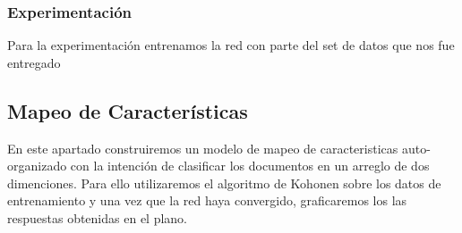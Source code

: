 \subsubsection{Experimentación}

Para la experimentación entrenamos la red con parte del set de datos que nos fue entregado



\subsection{Mapeo de Características}

En este apartado construiremos un modelo de mapeo de caracteristicas auto-organizado con la intención de clasificar los documentos en un arreglo de dos dimenciones. Para ello utilizaremos el algoritmo de Kohonen sobre los datos de entrenamiento y una vez que la red haya convergido, graficaremos los las respuestas obtenidas en el plano.